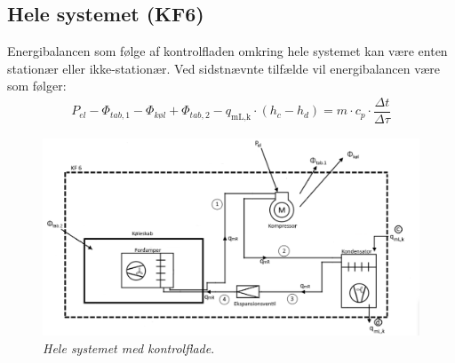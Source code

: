 \documentclass[../Hovedrapport.tex]{subfiles}
\begin{document}
\subsection{Hele systemet (KF6)}
Energibalancen som følge af kontrolfladen omkring hele systemet kan være enten stationær eller ikke-stationær. Ved sidstnævnte tilfælde vil energibalancen være som følger:
\begin{align}
\label{eq:helesystemEB}
    P_{el} - \Phi_{tab,1} - \Phi_{\textit{køl}} + \Phi_{tab,2} - q_\text{mL,k}\cdot (h_c - h_d) = m \cdot c_p \cdot \dfrac{\Delta t}{\Delta \tau}
\end{align}
\begin{figure}[H] %
	\centering
	\includegraphics[width=1\textwidth]{Billeder/KF_6.png}
	\caption{\textit{Hele systemet med kontrolflade}.}
	\label{fig:Hele systemet-KF}
\end{figure}
\end{document}
